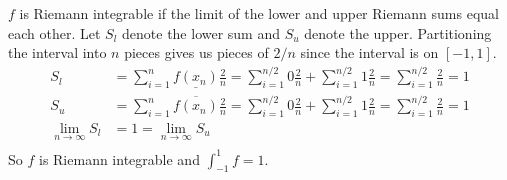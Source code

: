 \documentclass{homework}
\begin{document}
\question
$f$ is Riemann integrable if the limit of the lower and upper Riemann sums equal each other. Let $S_l$ denote the lower sum and $S_u$ denote the upper. Partitioning the interval into $n$ pieces gives us pieces of $2/n$ since the interval is on $[-1, 1]$.
\begin{align*}
	S_l	&=	\sum_{i=1}^n \underline{f(x_n)} \frac{2}{n}
		=	\sum_{i=1}^{n/2} 0 \frac{2}{n} + \sum_{i=1}^{n/2} 1 \frac{2}{n}
		=	\sum_{i=1}^{n/2} \frac{2}{n}
		=	1	\\
	S_u	&=	\sum_{i=1}^n \overline{f(x_n)} \frac{2}{n}
		=	\sum_{i=1}^{n/2} 0 \frac{2}{n} + \sum_{i=1}^{n/2} 1 \frac{2}{n}
		=	\sum_{i=1}^{n/2} \frac{2}{n}
		=	1	\\
	\lim_{n \to \infty} S_l &= 1 = \lim_{n \to \infty} S_u	\\
\end{align*}
So $f$ is Riemann integrable and $\int_{-1}^1 f = 1$.
\end{document}
